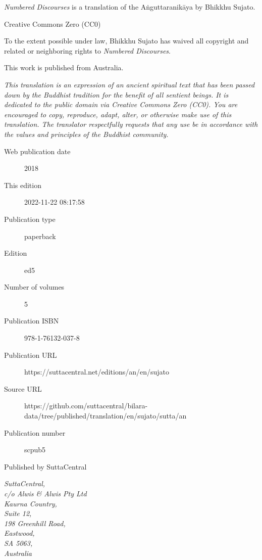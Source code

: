 \documentclass[12pt,openany]{book}%
\begin{document}
\begin{footnotesize}

\textit{Numbered Discourses} is a translation of the Aṅguttaranikāya by Bhikkhu Sujato.

\medskip

Creative Commons Zero (CC0)

To the extent possible under law, Bhikkhu Sujato has waived all copyright and related or neighboring rights to \textit{Numbered Discourses}.

\medskip

This work is published from Australia.

\begin{center}
\textit{This translation is an expression of an ancient spiritual text that has been passed down by the Buddhist tradition for the benefit of all sentient beings. It is dedicated to the public domain via Creative Commons Zero (CC0). You are encouraged to copy, reproduce, adapt, alter, or otherwise make use of this translation. The translator respectfully requests that any use be in accordance with the values and principles of the Buddhist community.}
\end{center}

\medskip

\begin{description}
    \item[Web publication date] 2018
    \item[This edition] 2022-11-22 08:17:58
    \item[Publication type] paperback
    \item[Edition] ed5
    \item[Number of volumes] 5
    \item[Publication ISBN] 978-1-76132-037-8
    \item[Publication URL] https://suttacentral.net/editions/an/en/sujato
    \item[Source URL] https://github.com/suttacentral/bilara-data/tree/published/translation/en/sujato/sutta/an
    \item[Publication number] scpub5
\end{description}

\medskip

Published by SuttaCentral

\medskip

\textit{SuttaCentral,\\
c/o Alwis \& Alwis Pty Ltd\\
Kaurna Country,\\
Suite 12,\\
198 Greenhill Road,\\
Eastwood,\\
SA 5063,\\
Australia}

\end{footnotesize}
\end{document}
